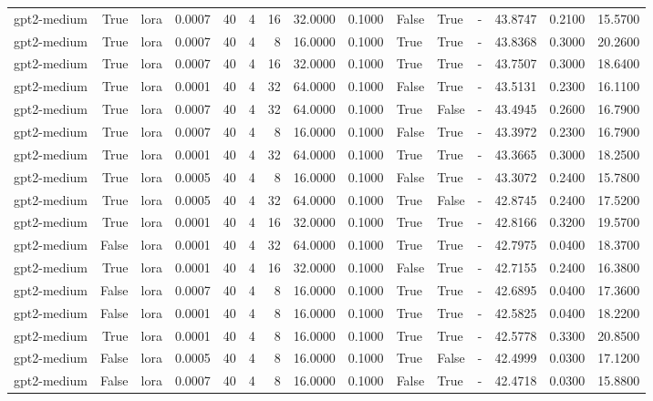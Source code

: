\begin{tabular}{lrlrrrrrrlllrrr}
gpt2-medium & True & lora & 0.0007 & 40 & 4 & 16 & 32.0000 & 0.1000 & False & True & - & 43.8747 & 0.2100 & 15.5700 \\
gpt2-medium & True & lora & 0.0007 & 40 & 4 & 8 & 16.0000 & 0.1000 & True & True & - & 43.8368 & 0.3000 & 20.2600 \\
gpt2-medium & True & lora & 0.0007 & 40 & 4 & 16 & 32.0000 & 0.1000 & True & True & - & 43.7507 & 0.3000 & 18.6400 \\
gpt2-medium & True & lora & 0.0001 & 40 & 4 & 32 & 64.0000 & 0.1000 & False & True & - & 43.5131 & 0.2300 & 16.1100 \\
gpt2-medium & True & lora & 0.0007 & 40 & 4 & 32 & 64.0000 & 0.1000 & True & False & - & 43.4945 & 0.2600 & 16.7900 \\
gpt2-medium & True & lora & 0.0007 & 40 & 4 & 8 & 16.0000 & 0.1000 & False & True & - & 43.3972 & 0.2300 & 16.7900 \\
gpt2-medium & True & lora & 0.0001 & 40 & 4 & 32 & 64.0000 & 0.1000 & True & True & - & 43.3665 & 0.3000 & 18.2500 \\
gpt2-medium & True & lora & 0.0005 & 40 & 4 & 8 & 16.0000 & 0.1000 & False & True & - & 43.3072 & 0.2400 & 15.7800 \\
gpt2-medium & True & lora & 0.0005 & 40 & 4 & 32 & 64.0000 & 0.1000 & True & False & - & 42.8745 & 0.2400 & 17.5200 \\
gpt2-medium & True & lora & 0.0001 & 40 & 4 & 16 & 32.0000 & 0.1000 & True & True & - & 42.8166 & 0.3200 & 19.5700 \\
gpt2-medium & False & lora & 0.0001 & 40 & 4 & 32 & 64.0000 & 0.1000 & True & True & - & 42.7975 & 0.0400 & 18.3700 \\
gpt2-medium & True & lora & 0.0001 & 40 & 4 & 16 & 32.0000 & 0.1000 & False & True & - & 42.7155 & 0.2400 & 16.3800 \\
gpt2-medium & False & lora & 0.0007 & 40 & 4 & 8 & 16.0000 & 0.1000 & True & True & - & 42.6895 & 0.0400 & 17.3600 \\
gpt2-medium & False & lora & 0.0001 & 40 & 4 & 8 & 16.0000 & 0.1000 & True & True & - & 42.5825 & 0.0400 & 18.2200 \\
gpt2-medium & True & lora & 0.0001 & 40 & 4 & 8 & 16.0000 & 0.1000 & True & True & - & 42.5778 & 0.3300 & 20.8500 \\
gpt2-medium & False & lora & 0.0005 & 40 & 4 & 8 & 16.0000 & 0.1000 & True & False & - & 42.4999 & 0.0300 & 17.1200 \\
gpt2-medium & False & lora & 0.0007 & 40 & 4 & 8 & 16.0000 & 0.1000 & False & True & - & 42.4718 & 0.0300 & 15.8800 \\

\end{tabular}
